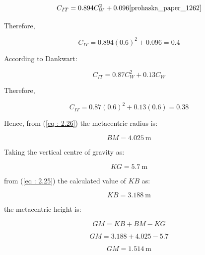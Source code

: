 \documentclass[12pt,a4paper,twoside]{report}
\begin{document}
\begin{equation}
C_{IT}=0.894C_W^2+0.096 \cite{prohaska_paper_1262}
\end{equation}

\vspace{\baselineskip} \par \noindent Therefore,

\[
C_{IT}=0.894(0.6)^2+0.096=0.4
\]

\vspace{\baselineskip} \par \noindent According to Dankwart:

\begin{equation}
C_{IT}=0.87C_W^2+0.13C_W
\end{equation}

\vspace{\baselineskip} \par \noindent Therefore,

\[
C_{IT}=0.87(0.6)^2+0.13(0.6)=0.38
\]

\vspace{\baselineskip} \par \noindent Hence, from (\ref{eq : 2.26}) the metacentric radius is:

\[
BM=4.025~\mathrm{m}
\]

\vspace{\baselineskip} \par \noindent Taking the vertical centre of gravity as:

\[
KG=5.7~\mathrm{m}
\]

\vspace{\baselineskip} \par \noindent from (\ref{eq : 2.25}) the calculated value of $KB$ as:

\[
KB=3.188~\mathrm{m}
\]

\vspace{\baselineskip} \par \noindent the metacentric height is:

\[
GM=KB+BM-KG
\]

\[
GM=3.188+4.025-5.7
\]

\[
GM=1.514~\mathrm{m}
\]
\end{document}
